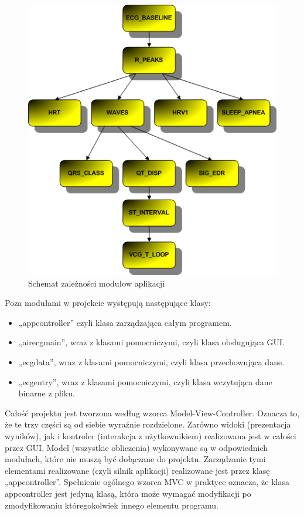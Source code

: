 \begin{figure}[H]
\centering
\includegraphics[scale=0.7]{MVC/img/EKG}
\caption{Schemat zależności modułow aplikacji}
\label{fig:zaleznosci}
\end{figure}

Poza modułami w projekcie występują następujące klasy:
\begin{itemize}
\item „appcontroller” czyli klasa zarządzająca całym programem.
\item „airecgmain”, wraz z klasami pomocniczymi, czyli klasa obsługująca GUI.
\item „ecgdata”, wraz z klasami pomocniczymi, czyli klasa przechowująca dane.
\item „ecgentry”, wraz z klasami pomocniczymi, czyli klasa wczytująca dane binarne z pliku.
\end{itemize}

Całość projektu jest tworzona według wzorca Model-View-Controller. Oznacza to, że te trzy części są od siebie wyraźnie rozdzielone. Zarówno widoki (prezentacja wyników), jak i kontroler (interakcja z użytkownikiem) realizowana jest w całości przez GUI. Model (wszystkie obliczenia) wykonywane są w odpowiednich modułach, które nie muszą być dołączane do projektu. Zarządzanie tymi elementami realizowane (czyli silnik aplikacji) realizowane jest przez klasę „appcontroller”. Spełnienie ogólnego wzorca MVC w praktyce oznacza, że klasa appcontroller jest jedyną klasą, która może wymagać modyfikacji po zmodyfikowaniu któregokolwiek innego elementu programu.

